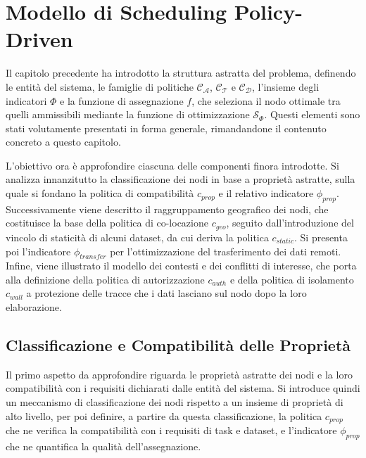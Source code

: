 \chapter{Modello di Scheduling Policy-Driven}
\label{cap:modello}

Il capitolo precedente ha introdotto la struttura astratta del problema, definendo le entità del sistema, le famiglie di politiche $\mathcal{C_A}$, $\mathcal{C_T}$ e $\mathcal{C_D}$, l'insieme degli indicatori $\Phi$ e la funzione di assegnazione $f$, che seleziona il nodo ottimale tra quelli ammissibili mediante la funzione di ottimizzazione $\mathcal{S}_\Phi$. Questi elementi sono stati volutamente presentati in forma generale, rimandandone il contenuto concreto a questo capitolo.

L'obiettivo ora è approfondire ciascuna delle componenti finora introdotte. Si analizza innanzitutto la classificazione dei nodi in base a proprietà astratte, sulla quale si fondano la politica di compatibilità $c_{prop}$ e il relativo indicatore $\phi_{prop}$. Successivamente viene descritto il raggruppamento geografico dei nodi, che costituisce la base della politica di co-locazione $c_{geo}$, seguito dall'introduzione del vincolo di staticità di alcuni dataset, da cui deriva la politica $c_{static}$. Si presenta poi l'indicatore $\phi_{transfer}$ per l'ottimizzazione del trasferimento dei dati remoti. Infine, viene illustrato il modello dei contesti e dei conflitti di interesse, che porta alla definizione della politica di autorizzazione $c_{auth}$ e della politica di isolamento $c_{wall}$ a protezione delle tracce che i dati lasciano sul nodo dopo la loro elaborazione.


\section{Classificazione e Compatibilità delle Proprietà}
\label{sec:classificazione_compatibilita}

Il primo aspetto da approfondire riguarda le proprietà astratte dei nodi e la loro compatibilità con i requisiti dichiarati dalle entità del sistema. Si introduce quindi un meccanismo di classificazione dei nodi rispetto a un insieme di proprietà di alto livello, per poi definire, a partire da questa classificazione, la politica $c_{prop}$ che ne verifica la compatibilità con i requisiti di task e dataset, e l'indicatore $\phi_{prop}$ che ne quantifica la qualità dell'assegnazione.


